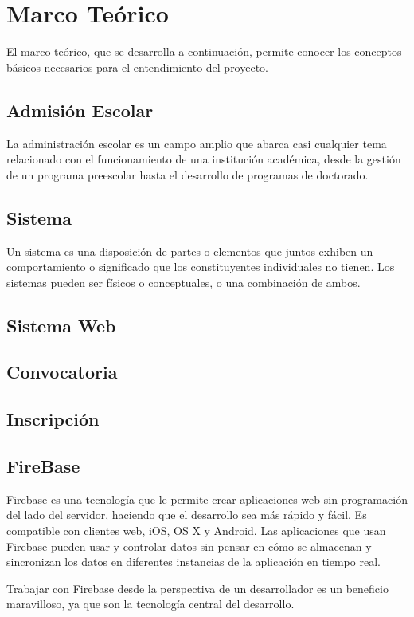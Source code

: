 \chapter{Marco Teórico} %
    
    El marco teórico, que se desarrolla a continuación, permite conocer los conceptos básicos necesarios para el entendimiento del proyecto. 
    \section{Admisión Escolar}
    La administración escolar es un campo amplio que abarca casi cualquier tema relacionado con el funcionamiento de una institución académica, desde la gestión de un programa preescolar hasta el desarrollo de programas de doctorado.
    \section{Sistema}
    Un sistema es una disposición de partes o elementos que juntos exhiben un comportamiento o significado que los constituyentes individuales no tienen.
    Los sistemas pueden ser físicos o conceptuales, o una combinación de ambos.
    \section{Sistema Web}

    \section{Convocatoria}
    \section{Inscripción}
    \section{FireBase}
    Firebase es una tecnología que le permite crear aplicaciones web sin programación del lado del servidor, haciendo que el desarrollo sea más rápido y fácil. Es compatible con clientes web, iOS, OS X y Android. Las aplicaciones que usan Firebase pueden usar y controlar datos sin pensar en cómo se almacenan y sincronizan los datos en diferentes instancias de la aplicación en tiempo real.

    Trabajar con Firebase desde la perspectiva de un desarrollador es un beneficio maravilloso, ya que son la tecnología central del desarrollo.
    
